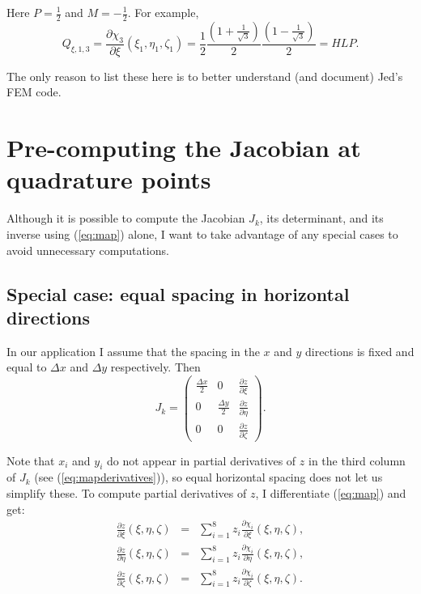 \documentclass{article}
\begin{document}
Here $P = \frac{1}{2}$ and $M = - \frac{1}{2}$. For example,
\[ Q_{\xi, 1, 3} = \frac{\partial \chi_3}{\partial \xi} (\xi_1, \eta_1,
   \zeta_1) = \frac{1}{2}  \frac{\left(1 + \frac{1}{\sqrt{3}} \right)}{2}
   \frac{\left(1 - \frac{1}{\sqrt{3}} \right)}{2} = HLP. \]
\begin{remark}
  The only reason to list these here is to better understand (and document)
  Jed's FEM code.
\end{remark}

\section{Pre-computing the Jacobian at quadrature points}

Although it is possible to compute the Jacobian $J_k$, its determinant, and
its inverse using (\ref{eq:map}) alone, I want to take advantage of any
special cases to avoid unnecessary computations.

\subsection{Special case: equal spacing in horizontal directions}

In our application I assume that the spacing in the $x$ and $y$ directions is
fixed and equal to $\Delta x$ and $\Delta y$ respectively. Then
\[ J_k = \left(\begin{array}{ccc}
     \frac{\Delta x}{2} & 0 & \frac{\partial z}{\partial \xi}\\
     0 & \frac{\Delta y}{2} & \frac{\partial z}{\partial \eta}\\
     0 & 0 & \frac{\partial z}{\partial \zeta}
   \end{array}\right) . \]


Note that $x_i$ and $y_i$ do not appear in partial derivatives of $z$ in the
third column of $J_k$ (see (\ref{eq:mapderivatives})), so equal horizontal
spacing does not let us simplify these. To compute partial derivatives of $z$,
I differentiate (\ref{eq:map}) and get:
\begin{eqnarray}
  \frac{\partial z}{\partial \xi} (\xi, \eta, \zeta) & = & \sum_{i = 1}^8 z_i
  \frac{\partial \chi_i}{\partial \xi} (\xi, \eta, \zeta), \nonumber\\
  \frac{\partial z}{\partial \eta} (\xi, \eta, \zeta) & = & \sum_{i = 1}^8
  z_i  \frac{\partial \chi_i}{\partial \eta} (\xi, \eta, \zeta),
  \label{eq:mapderivatives}\\
  \frac{\partial z}{\partial \zeta} (\xi, \eta, \zeta) & = & \sum_{i = 1}^8
  z_i  \frac{\partial \chi_i}{\partial \zeta} (\xi, \eta, \zeta) . \nonumber
\end{eqnarray}
\end{document}
